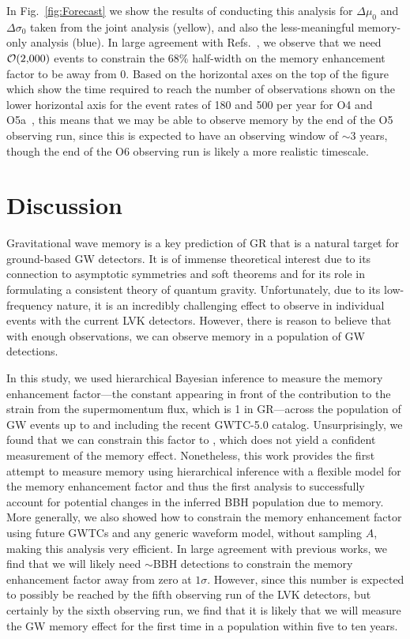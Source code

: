 \documentclass[aps,prd,reprint,twocolumn,10pt,eqsecnum,showpacs,nofootinbib,amsfonts,amssymb,amsmath,longbibliography,superscriptaddress,floatfix]{revtex4-1}
\newcommand{\OFourRates}{180\xspace}
\newcommand{\OFiveRates}{500\xspace}
\begin{document}
In Fig.~\ref{fig:Forecast} we show the results of conducting this analysis for $\Delta\mu_{0}$ and $\Delta\sigma_{0}$ taken from the joint analysis (yellow), and also the less-meaningful memory-only analysis (blue). In large agreement with Refs.~\cite{Hubner:2019sly,Boersma:2020gxx,Hubner:2021amk,Grant:2022bla,Cheung:2024zow}, we observe that we need $\mathcal{O}(\text{2,000})$ events to constrain the 68\% half-width on the memory enhancement factor to be away from $0$.  Based on the horizontal axes on the top of the figure which show the time required to reach the number of observations shown on the lower horizontal axis for the event rates of \OFourRates and \OFiveRates per year for O4 and O5a~\cite{IGWN:ObservingCapabilities:2026}, this means that we may be able to observe memory by the end of the O5 observing run, since this is expected to have an observing window of $\sim$3 years, though the end of the O6 observing run is likely a more realistic timescale.

\section{Discussion}
\label{sec:discussion}

Gravitational wave memory is a key prediction of GR that is a natural target for ground-based GW detectors. It is of immense theoretical interest due to its connection to asymptotic symmetries and soft theorems and for its role in formulating a consistent theory of quantum gravity. Unfortunately, due to its low-frequency nature, it is an incredibly challenging effect to observe in individual events with the current LVK detectors. However, there is reason to believe that with enough observations, we can observe memory in a population of GW detections.

In this study, we used hierarchical Bayesian inference to measure the memory enhancement factor---the constant appearing in front of the contribution to the strain from the supermomentum flux, which is 1 in GR---across the population of GW events up to and including the recent GWTC-5.0 catalog. Unsurprisingly, we found that we can constrain this factor to \Aconstraint, which does not yield a confident measurement of the memory effect. Nonetheless, this work provides the first attempt to measure memory using hierarchical inference with a flexible model for the memory enhancement factor and thus the first analysis to successfully account for potential changes in the inferred BBH population due to memory. More generally, we also showed how to constrain the memory enhancement factor using future GWTCs and any generic waveform model, without sampling $A$, making this analysis very efficient. In large agreement with previous works, we find that we will likely need $\sim$\NForecastCrossing BBH detections to constrain the memory enhancement factor away from zero at $1\sigma$. However, since this number is expected to possibly be reached by the fifth observing run of the LVK detectors, but certainly by the sixth observing run, we find that it is likely that we will measure the GW memory effect for the first time in a population within five to ten years.
\end{document}
